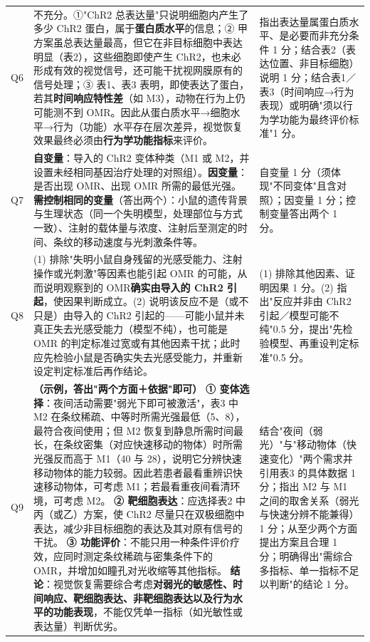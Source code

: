 \documentclass[UTF8,a4paper,11pt]{ctexart}
\begin{document}
\begin{longtable}{@{}p{0.9cm}p{9.6cm}p{4.2cm}@{}}
\addlinespace
Q6 & 不充分。①"ChR2 总表达量"只说明细胞内产生了多少 ChR2 蛋白，属于\textbf{蛋白质水平}的信息；② 甲方案虽总表达量最高，但它在非目标细胞中表达明显（表2），这些细胞即使产生 ChR2，也未必形成有效的视觉信号，还可能干扰视网膜原有的信号处理；③ 表1、表3 表明，即使表达了蛋白，若其\textbf{时间响应特性差}（如 M3），动物在行为上仍可能测不到 OMR。因此从蛋白质水平→细胞水平→行为（功能）水平存在层次差异，视觉恢复效果最终必须由\textbf{行为学功能指标}来评价。 & 指出表达量属蛋白质水平、是必要而非充分条件 1 分；结合表2（表达位置、非目标细胞）说明 1 分；结合表1／表3（时间响应→行为表现）或明确"须以行为学功能为最终评价标准"1 分。 \\
\addlinespace
Q7 & \textbf{自变量}：导入的 ChR2 变体种类（M1 或 M2，并设置未经相同基因治疗处理的对照组）。\textbf{因变量}：是否出现 OMR、出现 OMR 所需的最低光强。\textbf{需控制相同的变量}（答出两个）：小鼠的遗传背景与生理状态（同一个失明模型，处理部位与方式一致）、注射的载体量与浓度、注射后至测定的时间、条纹的移动速度与光刺激条件等。 & 自变量 1 分（须体现"不同变体"且含对照）；因变量 1 分；控制变量答出两个 1 分。 \\
\addlinespace
Q8 & (1) 排除"失明小鼠自身残留的光感受能力、注射操作或光刺激"等因素也能引起 OMR 的可能，从而说明观察到的 OMR\textbf{确实由导入的 ChR2 引起}，使因果判断成立。(2) 说明该反应不是（或不只是）由导入的 ChR2 引起的——可能小鼠并未真正失去光感受能力（模型不纯），也可能是 OMR 的判定标准过宽或有其他因素干扰；此时应先检验小鼠是否确实失去光感受能力，并重新设定判定标准后再作结论。 & (1) 排除其他因素、证明因果 1 分。(2) 指出"反应并非由 ChR2 引起／模型可能不纯"0.5 分，提出"先检验模型、再重设判定标准"0.5 分。 \\
\addlinespace
Q9 & \textbf{（示例，答出"两个方面＋依据"即可）}\newline
\textbf{① 变体选择}：夜间活动需要"弱光下即可被激活"，表3 中 M2 在条纹稀疏、中等时所需光强最低（5、8），最符合夜间使用；但 M2 恢复到静息所需时间最长，在条纹密集（对应快速移动的物体）时所需光强反而高于 M1（40 与 28），说明它分辨快速移动物体的能力较弱。因此若患者最看重辨识快速移动物体，可考虑 M1；若最看重夜间看清环境，可考虑 M2。\newline
\textbf{② 靶细胞表达}：应选择表2 中丙（或乙）方案，使 ChR2 尽量只在双极细胞中表达，减少非目标细胞的表达及其对原有信号的干扰。\newline
\textbf{③ 功能评价}：不能只用一种条件评价疗效，应同时测定条纹稀疏与密集条件下的 OMR，并增加如瞳孔对光收缩等其他指标。\newline
\textbf{结论}：视觉恢复需要综合考虑\textbf{对弱光的敏感性、时间响应、靶细胞表达、非靶细胞表达以及行为水平的功能表现}，不能仅凭单一指标（如光敏性或表达量）判断优劣。 & 结合"夜间（弱光）"与"移动物体（快速变化）"两个需求并引用表3 的具体数据 1 分；指出 M2 与 M1 之间的取舍关系（弱光与快速分辨不能兼得）1 分；从至少两个方面提出方案且合理 1 分；明确得出"需综合多指标、单一指标不足以判断"的结论 1 分。 \\
\bottomrule
\end{longtable}
\end{document}
